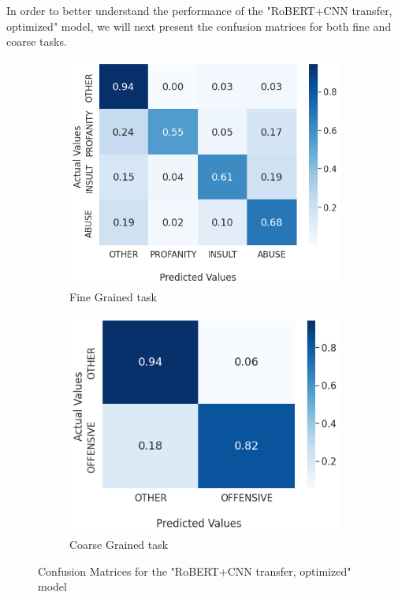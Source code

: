 \documentclass[12pt,a4paper]{report}
\begin{document}
In order to better understand the performance of the  "RoBERT+CNN transfer, optimized" model, we will next present the confusion matrices for both fine and coarse tasks.

\begin{figure}[H]
\begin{subfigure}{.5\textwidth}
  \centering
  \includegraphics[width=.8\linewidth]{pics/FG-NORMALIZED-BERT-CNN-TRANSF.png}  
  \caption{Fine Grained task}
  \label{fig:FG-CM-BERT-CNN-TRANSF}
\end{subfigure}
\begin{subfigure}{.5\textwidth}
  \centering
  \includegraphics[width=.8\linewidth]{pics/CG-NORMALIZED-BERT-CNN-TRANSF.png}  
  \caption{Coarse Grained task}
  \label{fig:CG-CM-BERT-CNN-TRANSF}
\end{subfigure}
\caption{Confusion Matrices for the "RoBERT+CNN transfer, optimized" model}
\label{fig:transfer-CM}
\end{figure}
\end{document}
